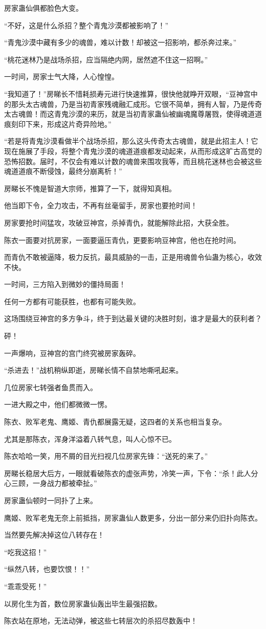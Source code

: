 \begin{this_body}
房家蛊仙俱都脸色大变。

“不好，这是什么杀招？整个青鬼沙漠都被影响了！”

“青鬼沙漠中藏有多少的魂兽，难以计数！却被这一招影响，都杀奔过来。”

“桃花迷林乃是战场杀招，应当隔绝内网，居然遮不住这一招啊。”

一时间，房家士气大降，人心惶惶。

“我知道了！”房睇长不惜耗损寿元进行快速推算，很快他就睁开双眼，“豆神宫中的那头太古魂兽，乃是当初青家残魂融汇成形。它很不简单，拥有人智，乃是传奇太古魂兽！而这青鬼沙漠的来历，就是当初青家蛊仙被幽魂魔尊屠戮，使得魂道道痕刻印下来，形成这片奇异险地。”

“若是将青鬼沙漠看做半个战场杀招，那么这头传奇太古魂兽，就是此招主人！它现在施展了手段，将整个青鬼沙漠的魂道道痕都发动起来，从而形成这旷古高觉的恐怖招数。届时，不仅会有难以计数的魂兽来围攻我等，而且桃花迷林也会被这些魂道道痕不断侵蚀，最终分崩离析！”

房睇长不愧是智道大宗师，推算了一下，就得知真相。

他当即下令，全力攻击，不再有丝毫留手，房家也要抢时间！

房家要抢时间猛攻，攻破豆神宫，杀掉青仇，就能解除此招，大获全胜。

陈衣一面要对抗房家，一面要逼压青仇，更要影响豆神宫，他也在抢时间。

而青仇不敢被逼降，极力反抗，最具威胁的一击，正是用魂兽令仙蛊为核心，收效不快。

一时间，三方陷入到微妙的僵持局面！

任何一方都有可能获胜，也都有可能失败。

这场围绕豆神宫的多方争斗，终于到达最关键的决胜时刻，谁才是最大的获利者？

砰！

一声爆响，豆神宫的宫门终究被房家轰碎。

“杀进去！”战机稍纵即逝，房睇长情不自禁地嘶吼起来。

几位房家七转强者鱼贯而入。

一进大殿之中，他们都微微一愣。

陈衣、败军老鬼、鹰姬、青仇都展露无疑，这四者的关系也相当复杂。

尤其是那陈衣，浑身洋溢着八转气息，叫人心惊不已。

陈衣哈哈一笑，用不屑的目光扫视几位房家先锋：“送死的来了。”

房睇长稳居大后方，一眼就看破陈衣的虚张声势，冷笑一声，下令：“杀！此人分心三顾，一身战力都被牵扯。”

房家蛊仙顿时一同扑了上来。

鹰姬、败军老鬼无奈上前抵挡，房家蛊仙人数更多，分出一部分来仍旧扑向陈衣。

当然要先解决掉这位八转存在！

“吃我这招！”

“纵然八转，也要饮恨！！”

“乖乖受死！”

以房化生为首，数位房家蛊仙轰出毕生最强招数。

陈衣站在原地，无法动弹，被这些七转层次的杀招尽数轰中！

\end{this_body}

